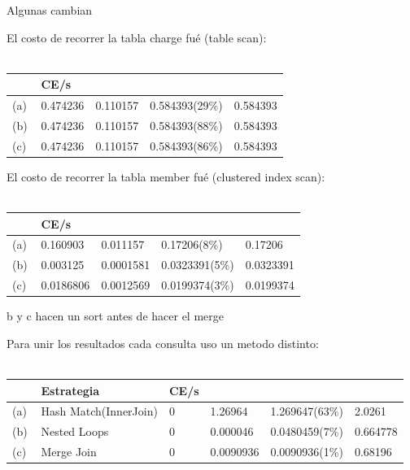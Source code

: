Algunas cambian

El costo de recorrer la tabla charge fué (table scan): \\ \\

\begin{tabular}{| L | L | L | L | L |}
    \hline
     & CE/s &  &  &  \\ \hline
    (a) & 0.474236 & 0.110157 & 0.584393(29\%) & 0.584393 \\ \hline
    (b) & 0.474236 & 0.110157 & 0.584393(88\%) & 0.584393 \\ \hline
    (c) & 0.474236 & 0.110157 & 0.584393(86\%) & 0.584393 \\ \hline
\end{tabular}

El costo de recorrer la tabla member fué (clustered index scan): \\ \\

\begin{tabular}{| L | L | L | L | L |}
    \hline
     & CE/s &  &  &  \\ \hline
    (a) & 0.160903 & 0.011157 & 0.17206(8\%) & 0.17206 \\ \hline
    (b) & 0.003125 & 0.0001581 & 0.0323391(5\%) & 0.0323391 \\ \hline
    (c) & 0.0186806 & 0.0012569 & 0.0199374(3\%) & 0.0199374 \\ \hline
\end{tabular}

b y c hacen un sort antes de hacer el merge


Para unir los resultados cada consulta uso un metodo distinto:\\ \\

\begin{tabular}{| L | L | L | L | L | L |}
    \hline
     & Estrategia & CE/s &  &  &  \\ \hline
    (a) & Hash Match(InnerJoin) & 0 & 1.26964 & 1.269647(63\%) & 2.0261 \\ \hline
    (b) & Nested Loops & 0 & 0.000046 & 0.0480459(7\%) & 0.664778 \\ \hline
    (c) & Merge Join & 0 & 0.0090936 & 0.0090936(1\%) & 0.68196 \\ \hline
\end{tabular}

